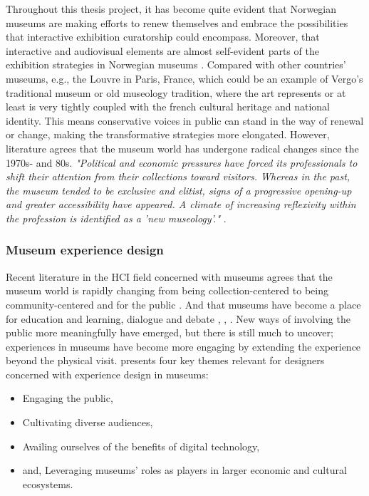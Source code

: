Throughout this thesis project, it has become quite evident that Norwegian museums are making efforts to renew themselves and embrace the possibilities that interactive exhibition curatorship could encompass. Moreover, that interactive and audiovisual elements are almost self-evident parts of the exhibition strategies in Norwegian museums \autocite[p. 59]{melding23}. Compared with other countries' museums, e.g., the Louvre in Paris, France, which could be an example of Vergo's traditional museum or old museology tradition, where the art represents or at least is very tightly coupled with the french cultural heritage and national identity. This means conservative voices in public can stand in the way of renewal or change, making the transformative strategies more elongated. However, literature agrees that the museum world has undergone radical changes since the 1970s- and 80s. \emph{"Political and economic pressures have forced its professionals to shift their attention from their collections toward visitors. Whereas in the past, the museum tended to be exclusive and elitist, signs of a progressive opening-up and greater accessibility have appeared. A climate of increasing reflexivity within the profession is identified as a 'new museology'."} \autocite[p. 84]{ross_interpreting_2015}.

\subsubsection{Museum experience design}
Recent literature in the HCI field concerned with museums agrees that the museum world is rapidly changing from being collection-centered to being community-centered and for the public \autocite[p. 1]{vermeeren_museum_2018}. And that museums have become a place for education and learning, dialogue and debate \autocite{hein_1998}, \autocite{hooper_1994}, \autocite{Roberts_1997}. New ways of involving the public more meaningfully have emerged, but there is still much to uncover; experiences in museums have become more engaging by extending the experience beyond the physical visit. \autocite{vermeeren_museum_2018} presents four key themes relevant for designers concerned with experience design in museums:

\begin{itemize}
    \item Engaging the public,
    \item Cultivating diverse audiences,
    \item Availing ourselves of the benefits of digital technology,
    \item and, Leveraging museums’ roles as players in larger economic and cultural ecosystems.
\end{itemize}

